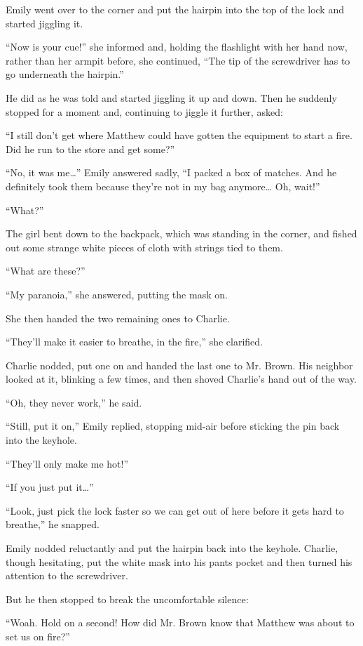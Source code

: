 Emily went over to the corner and put the hairpin into the top of the lock and started jiggling it.

“Now is your cue!” she informed and, holding the flashlight with her hand now, rather than her armpit before, she continued, “The tip of the screwdriver has to go underneath the hairpin.”

He did as he was told and started jiggling it up and down. Then he suddenly stopped for a moment and, continuing to jiggle it further, asked:

“I still don't get where Matthew could have gotten the equipment to start a fire. Did he run to the store and get some?”

“No, it was me…” Emily answered sadly, “I packed a box of matches. And he definitely took them because they're not in my bag anymore… Oh, wait!”

“What?”

The girl bent down to the backpack, which was standing in the corner, and fished out some strange white pieces of cloth with strings tied to them.

“What are these?”

“My paranoia,” she answered, putting the mask on.

She then handed the two remaining ones to Charlie.

“They'll make it easier to breathe, in the fire,” she clarified.

Charlie nodded, put one on and handed the last one to Mr. Brown. His neighbor looked at it, blinking a few times, and then shoved Charlie's hand out of the way.

“Oh, they never work,” he said.

“Still, put it on,” Emily replied, stopping mid-air before sticking the pin back into the keyhole.

“They'll only make me hot!”

“If you just put it…”

“Look, just pick the lock faster so we can get out of here before it gets hard to breathe,” he snapped.

Emily nodded reluctantly and put the hairpin back into the keyhole. Charlie, though hesitating, put the white mask into his pants pocket and then turned his attention to the screwdriver.

But he then stopped to break the uncomfortable silence:

“Woah. Hold on a second! How did Mr. Brown know that Matthew was about to set us on fire?”

